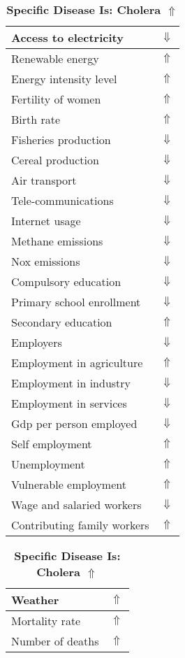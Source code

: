 \documentclass[12pt,notitlepage,oneside]{report}
\begin{document}
\begin{table}[!htb]
\caption{\textbf{Specific Disease Is: Cholera $\Uparrow$}}
\centering
\label{Correlated Socio-economic Factors0}
\begin{tabular}{|l|l|}
\hline
Access to electricity & $\Downarrow$\\ \hline
Renewable energy & $\Uparrow$\\ \hline
Energy intensity level & $\Uparrow$\\ \hline
Fertility of women & $\Uparrow$\\ \hline
Birth rate & $\Uparrow$\\ \hline
Fisheries production & $\Downarrow$\\ \hline
Cereal production & $\Downarrow$\\ \hline
Air transport  & $\Downarrow$\\ \hline
Tele-communications & $\Downarrow$\\ \hline
Internet usage & $\Downarrow$\\ \hline
Methane emissions & $\Downarrow$\\ \hline
Nox emissions & $\Downarrow$\\ \hline
Compulsory education & $\Downarrow$\\ \hline
Primary school enrollment & $\Downarrow$\\ \hline
Secondary education & $\Uparrow$\\ \hline
Employers & $\Downarrow$\\ \hline
Employment in agriculture & $\Uparrow$\\ \hline
Employment in industry & $\Downarrow$\\ \hline
Employment in services & $\Downarrow$\\ \hline
Gdp per person employed & $\Downarrow$\\ \hline
Self employment & $\Uparrow$\\ \hline
Unemployment & $\Uparrow$\\ \hline
Vulnerable employment & $\Uparrow$\\ \hline
Wage and salaried workers & $\Downarrow$\\ \hline
Contributing family workers & $\Uparrow$\\ \hline
\end{tabular}
\begin{tabular}{|l|l|}
\hline
Weather & $\Uparrow$\\ \hline
Mortality rate & $\Uparrow$\\ \hline
Number of deaths & $\Uparrow$\\ \hline

\end{tabular}
\end{table}
\end{document}
